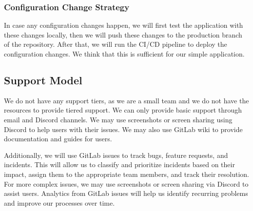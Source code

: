 \subsubsection{Configuration Change Strategy}
In case any configuration changes happen, we will first test the application
with these changes locally, then we will push these changes to the production
branch of the repository. After that, we will run the CI/CD pipeline to deploy the configuration changes.
We think that this is sufficient for our simple application.


\subsection{Support Model}

We do not have any support tiers, as we are a small team and we do not have the
resources to provide tiered support. We can only provide basic support through
email and Discord channels. We may use screenshots or screen sharing using
Discord to help users with their issues. We may also use GitLab wiki to provide documentation and guides for users.

Additionally, we will use GitLab issues to track bugs, feature requests, and
incidents. This will allow us to classify and prioritize incidents based on
their impact, assign them to the appropriate team members, and track their
resolution. For more complex issues, we may use screenshots or screen sharing
via Discord to assist users. Analytics from GitLab issues will help us identify
recurring problems and improve our processes over time.

